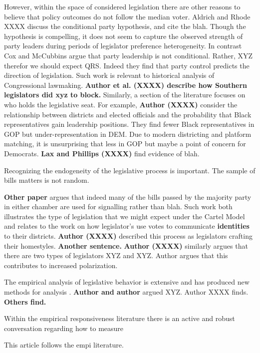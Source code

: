 \documentclass[10pt,letterpaper]{article}
\begin{document}
However, within the space of considered legislation there are other reasons to believe that policy outcomes do not follow the median voter. Aldrich and Rhode XXXX discuss the conditional party hypothesis, and cite the blah. Though the hypothesis is compelling, it does not seem to capture the observed strength of party leaders during periods of legislator preference heterogeneity. In contrast Cox and McCubbins argue that party leadership is not conditional. Rather, XYZ therefor we should expect QRS. Indeed they find that party control predicts the direction of legislation. Such work is relevant to historical analysis of Congressional lawmaking. \textbf{Author et al. (XXXX) describe how Southern legislators did xyz to block.} Similarly, a section of the literature focuses on who holds the legislative seat. For example, \textbf{Author (XXXX)} consider the relationship between districts and elected officials and the probability that Black representatives gain leadership positions. They find fewer Black representatives in GOP but under-representation in DEM. Due to modern districting and platform matching, it is unsurprising that less in GOP but maybe a point of concern for Democrats. \textbf{Lax and Phillips (XXXX)} find evidence of blah.

Recognizing the endogeneity of the legislative process is important. The sample of bills matters is not random.

\textbf{Other paper} argues that indeed many of the bills passed by the majority party in either chamber are used for signalling rather than blah. Such work both illustrates the type of legislation that we might expect under the Cartel Model and relates to the work on how legislator's use votes to communicate \textbf{identities} to their districts. \textbf{Author (XXXX)} described this process as legislators crafting their homestyles. \textbf{Another sentence.} \textbf{Author (XXXX)} similarly argues that there are two types of legislators XYZ and XYZ. Author argues that this contributes to increased polarization.

The empirical analysis of legislative behavior is extensive and has produced new methods for analysis . \textbf{Author and author} argued XYZ. Author XXXX finds. \textbf{Others find.}

Within the empirical responsiveness literature there is an active and robust conversation regarding how to measure 	

This article follows the empi literature.
\end{document}
